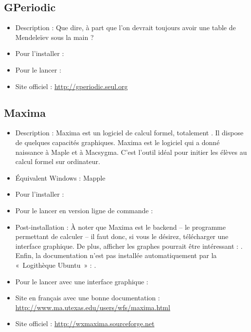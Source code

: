 \subsection{GPeriodic}
\begin{itemize}
\begingroup
{}
\item Description : Que dire, à part que l'on devrait toujours avoir une table de Mendeleïev sous la main ?{\par}
\item Pour l'installer : 
\item Pour le lancer : 
\item Site officiel : \url{http://gperiodic.seul.org}{\par}
\endgroup
\end{itemize}
\newpage
\subsection{Maxima}
\begin{itemize}
\begingroup
{}
\item Description : Maxima est un logiciel de calcul formel, totalement . Il dispose de quelques capacités graphiques. Maxima est le logiciel qui a donné naissance à Maple et à Macsygma. C'est l'outil idéal pour initier les élèves au calcul formel sur ordinateur.{\par}
\item Équivalent Windows : Mapple{\par}
\item Pour l'installer : 
\item Pour le lancer en version ligne de commande : 
\endgroup
\item Post-installation : À noter que Maxima est le backend -- le programme permettant de calculer -- il faut donc, si vous le désirez, télécharger une interface graphique. De plus, afficher les graphes pourrait être intéressant : . Enfin, la documentation n'est pas installée automatiquement par la «~Logithèque Ubuntu~» : .{\par}
\item Pour le lancer avec une interface graphique : 
\item Site en français avec une bonne documentation : \url{http://www.ma.utexas.edu/users/wfs/maxima.html}{\par}
\item Site officiel : \url{http://wxmaxima.sourceforge.net}{\par}
\end{itemize}
